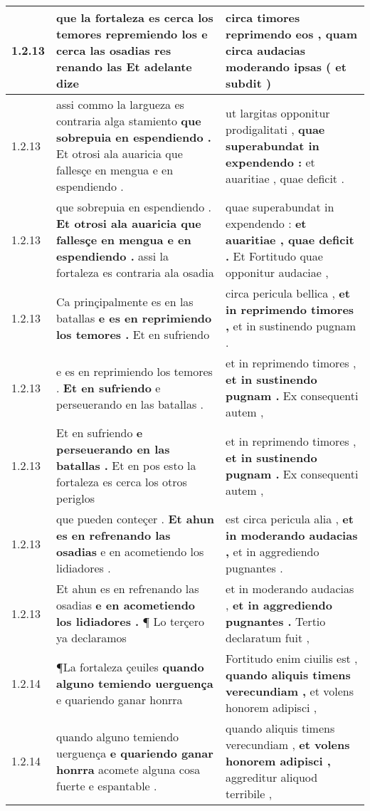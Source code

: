 \begin{tabular}{|p{1cm}|p{6.5cm}|p{6.5cm}|}
1.2.13 & que la fortaleza es cerca los temores repremiendo los \textbf{ e cerca las osadias res renando las } Et adelante dize & circa timores reprimendo eos , \textbf{ quam circa audacias moderando ipsas } ( et subdit ) \\\hline
1.2.13 & assi commo la largueza es contraria alga stamiento \textbf{ que sobrepuia en espendiendo . } Et otrosi ala auaricia que fallesçe en mengua e en espendiendo . & ut largitas opponitur prodigalitati , \textbf{ quae superabundat in expendendo : } et auaritiae , quae deficit . \\\hline
1.2.13 & que sobrepuia en espendiendo . \textbf{ Et otrosi ala auaricia que fallesçe en mengua e en espendiendo . } assi la fortaleza es contraria ala osadia & quae superabundat in expendendo : \textbf{ et auaritiae , quae deficit . } Et Fortitudo quae opponitur audaciae , \\\hline
1.2.13 & Ca prinçipalmente es en las batallas \textbf{ e es en reprimiendo los temores . } Et en sufriendo & circa pericula bellica , \textbf{ et in reprimendo timores , } et in sustinendo pugnam . \\\hline
1.2.13 & e es en reprimiendo los temores . \textbf{ Et en sufriendo } e perseuerando en las batallas . & et in reprimendo timores , \textbf{ et in sustinendo pugnam . } Ex consequenti autem , \\\hline
1.2.13 & Et en sufriendo \textbf{ e perseuerando en las batallas . } Et en pos esto la fortaleza es cerca los otros periglos & et in reprimendo timores , \textbf{ et in sustinendo pugnam . } Ex consequenti autem , \\\hline
1.2.13 & que pueden conteçer . \textbf{ Et ahun es en refrenando las osadias } e en acometiendo los lidiadores . & est circa pericula alia , \textbf{ et in moderando audacias , } et in aggrediendo pugnantes . \\\hline
1.2.13 & Et ahun es en refrenando las osadias \textbf{ e en acometiendo los lidiadores . } ¶ Lo terçero ya declaramos & et in moderando audacias , \textbf{ et in aggrediendo pugnantes . } Tertio declaratum fuit , \\\hline
1.2.14 & ¶La fortaleza çeuiles \textbf{ quando alguno temiendo uerguença } e quariendo ganar honrra & Fortitudo enim ciuilis est , \textbf{ quando aliquis timens verecundiam , } et volens honorem adipisci , \\\hline
1.2.14 & quando alguno temiendo uerguença \textbf{ e quariendo ganar honrra } acomete alguna cosa fuerte e espantable . & quando aliquis timens verecundiam , \textbf{ et volens honorem adipisci , } aggreditur aliquod terribile , \\\hline

\end{tabular}
